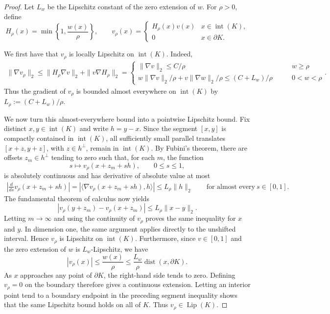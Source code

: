 \documentclass[11pt]{article}
\theoremstyle{definition}
\theoremstyle{remark}
\newcommand{\Lip}{\operatorname{Lip}}
\begin{document}
\begin{proof}
Let $L_w$ be the Lipschitz constant of the zero extension of $w$.  For
$\rho>0$, define
\[
 H_\rho(x)=\min\left\{1,\frac{w(x)}{\rho}\right\},
 \qquad
 v_\rho(x)=\begin{cases}
     H_\rho(x) v(x) & x\in \operatorname{int}(K),\\
     0 & x\in \partial K.
 \end{cases}
\]

We first have that $v_\rho$ is locally Lipschitz on ${\operatorname{int}(K)}$.  Indeed, 
\begin{align*}
    \|\nabla v_\rho\|_2 \leq \|H_\rho\nabla v\|_2 + \|v\nabla H_\rho\|_2= \begin{cases}
        \|\nabla v\|_2\leq C/\rho & \qquad w\geq \rho\\
        w\|\nabla v\|_2/\rho + v\|\nabla w\|_2/\rho\leq (C+L_w)/\rho  & \qquad 0<w<\rho
    \end{cases}. 
\end{align*}
Thus the gradient of $v_\rho$ is bounded almost everywhere on ${\operatorname{int}(K)}$ by \(L_\rho:=(C+L_w)/\rho\).  
 
We now turn this almost-everywhere bound into a pointwise Lipschitz bound.  Fix distinct $x,y\in{\operatorname{int}(K)}$ and write $h=y-x$.  Since the segment $[x,y]$ is compactly contained in $\operatorname{int}(K)$, all sufficiently small parallel translates $[x+z,y+z]$, with $z\in h^\perp$, remain in ${\operatorname{int}(K)}$.  By Fubini's theorem, there are offsets $z_m\in h^\perp$ tending to zero such that, for each $m$, the function
\[
  s\longmapsto v_\rho(x+z_m+sh),\qquad 0\le s\le1,
\]
is absolutely continuous and has derivative of absolute value at most
\begin{align*}
\left|\frac{d}{ds}v_\rho(x+z_m+sh)\right|= \left|\langle\nabla v_\rho(x+z_m+sh),h\rangle\right|\leq L_\rho\|h\|_2 \qquad \text{for almost every}~s\in [0,1].
\end{align*}
The fundamental theorem of calculus now yields
\[
  |v_\rho(y+z_m)-v_\rho(x+z_m)|
  \le L_\rho\|x-y\|_2.
\]
Letting $m\to\infty$ and using the continuity of $v_\rho$ proves the same inequality for $x$ and $y$. In dimension one, the same argument applies directly to the unshifted interval.  Hence $v_\rho$ is Lipschitz on ${\operatorname{int}(K)}$.  Furthermore, since $v\in [0,1]$ and the zero extension of $w$ is $L_w$-Lipschitz, we have
\[
 |v_\rho(x)|\le\frac{w(x)}\rho
 \le\frac{L_w}{\rho}\operatorname{dist}(x,\partial K).
\]
 As $x$ approaches any point of $\partial K$, the right-hand side tends to
 zero.  Defining $v_\rho=0$ on the boundary therefore gives a continuous
 extension.  Letting an interior point tend to a boundary endpoint in the
 preceding segment inequality shows that the same Lipschitz bound holds on
 all of $K$.  Thus $v_\rho\in\Lip(K)$.


\end{proof}
\end{document}
